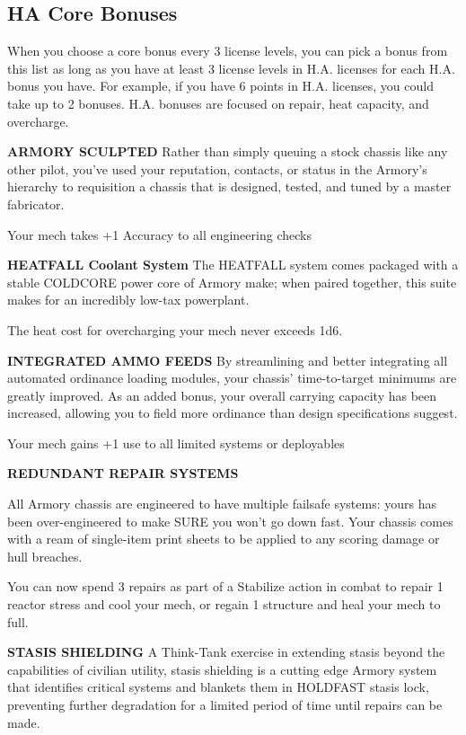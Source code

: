 \subsection{HA Core Bonuses}

When you choose a core bonus every 3 license levels, you can pick a bonus from this list as long
as you have at least 3 license levels in H.A. licenses for each H.A. bonus you have. For example,
if you have 6 points in H.A. licenses, you could take up to 2 bonuses. H.A. bonuses are focused
on repair, heat capacity, and overcharge.


\textbf{ARMORY SCULPTED}
Rather than simply queuing a stock chassis like any other pilot, you've used your reputation, contacts, or status in the Armory's hierarchy to requisition a chassis that is designed, tested, and tuned by a master fabricator.

Your mech takes +1 Accuracy to all engineering checks

\textbf{HEATFALL Coolant System}
The HEATFALL system comes packaged with a stable COLDCORE power core of Armory make; when paired together, this suite makes for an incredibly low-tax powerplant.

The heat cost for overcharging your mech never exceeds 1d6.


\textbf{INTEGRATED AMMO FEEDS}
By streamlining and better integrating all automated ordinance loading modules, your chassis' time-to-target minimums are greatly improved. As an added bonus, your overall carrying capacity has been increased, allowing you to field more ordinance than design specifications suggest.

Your mech gains +1 use to all limited systems or deployables


\textbf{REDUNDANT REPAIR SYSTEMS}

All Armory chassis are engineered to have multiple failsafe systems: yours has been over-engineered to make SURE you won't go down fast. Your chassis comes with a ream of single-item print sheets to be applied to any scoring damage or hull breaches.

You can now spend 3 repairs as part of a Stabilize action in combat to repair 1 reactor stress and cool your mech, or regain 1 structure and heal your mech to full.


\textbf{STASIS SHIELDING}
A Think-Tank exercise in extending stasis beyond the capabilities of civilian utility, stasis shielding is a cutting edge Armory system that identifies critical systems and blankets them in HOLDFAST stasis lock, preventing further degradation for a limited period of time until repairs can be made.

